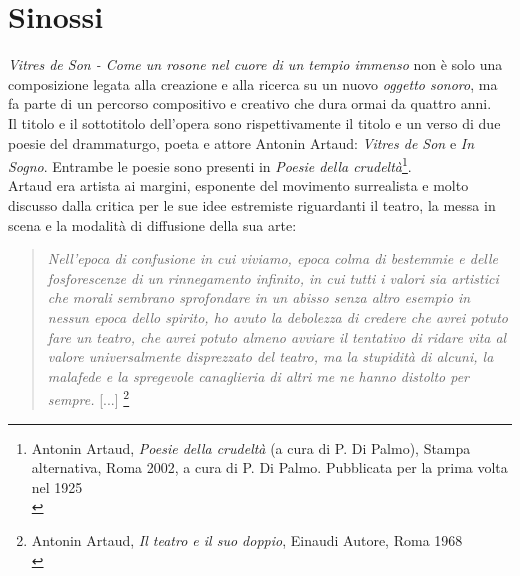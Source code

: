 
\chapter{Sinossi}
\label{chp:Sinossi}

\textit{Vitres de Son - Come un rosone nel cuore di un tempio immenso} non è solo una composizione legata alla creazione e alla ricerca su un nuovo \textit{oggetto sonoro}, ma fa parte di un percorso compositivo e creativo che dura ormai da quattro anni. \\
Il titolo e il sottotitolo dell'opera sono rispettivamente il titolo e un verso di due poesie del drammaturgo, poeta e attore Antonin Artaud: \textit{Vitres de Son} e \textit{In Sogno}. Entrambe le poesie sono presenti in \textit{Poesie della crudeltà}\footnote{Antonin Artaud, \textit{Poesie della crudeltà} (a cura di P. Di Palmo), Stampa alternativa, Roma 2002, a cura di P. Di Palmo. Pubblicata per la prima volta nel 1925 \\}. \\
Artaud era artista ai margini, esponente del movimento surrealista e molto discusso dalla critica per le sue idee estremiste riguardanti il teatro, la messa in scena  e la modalità di diffusione della sua arte:
\begin{small}
\begin{quotation}
\textit{Nell'epoca di confusione in cui viviamo, epoca colma di bestemmie e delle fosforescenze di un rinnegamento infinito, in cui tutti i valori sia artistici che morali sembrano sprofondare in un abisso senza altro esempio in nessun epoca dello spirito, ho avuto la debolezza di credere che avrei potuto fare un teatro, che avrei potuto almeno avviare il tentativo di ridare vita al valore universalmente disprezzato del teatro, ma la stupidità di alcuni, la malafede e la spregevole canaglieria di altri me ne hanno distolto per sempre. } [...] \footnote{Antonin Artaud, \textit{Il teatro e il suo doppio}, Einaudi Autore, Roma 1968 \\}
\end{quotation}
\end{small}
